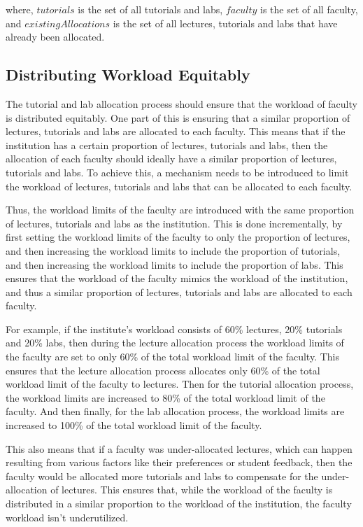 where, $tutorials$ is the set of all tutorials and labs, $faculty$ is the set of all faculty, and $existingAllocations$ is the set of all lectures, tutorials and labs that have already been allocated.

\subsection{Distributing Workload Equitably}

The tutorial and lab allocation process should ensure that the workload of faculty is distributed equitably. One part of this is ensuring that a similar proportion of lectures, tutorials and labs are allocated to each faculty. This means that if the institution has a certain proportion of lectures, tutorials and labs, then the allocation of each faculty should ideally have a similar proportion of lectures, tutorials and labs. To achieve this, a mechanism needs to be introduced to limit the workload of lectures, tutorials and labs that can be allocated to each faculty.

Thus, the workload limits of the faculty are introduced with the same proportion of lectures, tutorials and labs as the institution. This is done incrementally, by first setting the workload limits of the faculty to only the proportion of lectures, and then increasing the workload limits to include the proportion of tutorials, and then increasing the workload limits to include the proportion of labs. This ensures that the workload of the faculty mimics the workload of the institution, and thus a similar proportion of lectures, tutorials and labs are allocated to each faculty.

For example, if the institute's workload consists of 60\% lectures, 20\% tutorials and 20\% labs, then during the lecture allocation process the workload limits of the faculty are set to only 60\% of the total workload limit of the faculty. This ensures that the lecture allocation process allocates only 60\% of the total workload limit of the faculty to lectures. Then for the tutorial allocation process, the workload limits are increased to 80\% of the total workload limit of the faculty. And then finally, for the lab allocation process, the workload limits are increased to 100\% of the total workload limit of the faculty.

This also means that if a faculty was under-allocated lectures, which can happen resulting from various factors like their preferences or student feedback, then the faculty would be allocated more tutorials and labs to compensate for the under-allocation of lectures. This ensures that, while the workload of the faculty is distributed in a similar proportion to the workload of the institution, the faculty workload isn't underutilized.


